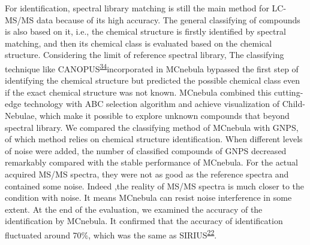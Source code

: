 \documentclass[
]{article}
\begin{document}
For identification, spectral library matching is still the main method
for LC-MS/MS data because of its high accuracy. The general classifying
of compounds is also based on it, i.e., the chemical structure is
firstly identified by spectral matching, and then its chemical class is
evaluated based on the chemical structure. Considering the limit of
reference spectral library, The classifying technique like
CANOPUS\textsuperscript{\protect\hyperlink{ref-duhrkop_systematic_2021}{34}}incorporated
in MCnebula bypassed the first step of identifying the chemical
structure but predicted the possible chemical class even if the exact
chemical structure was not known. MCnebula combined this cutting-edge
technology with ABC selection algorithm and achieve visualization of
Child-Nebulae, which make it possible to explore unknown compounds that
beyond spectral library. We compared the classifying method of MCnebula
with GNPS, of which method relies on chemical structure identification.
When different levels of noise were added, the number of classified
compounds of GNPS decreased remarkably compared with the stable
performance of MCnebula. For the actual acquired MS/MS spectra, they
were not as good as the reference spectra and contained some noise.
Indeed ,the reality of MS/MS spectra is much closer to the condition
with noise. It means MCnebula can resist noise interference in some
extent. At the end of the evaluation, we examined the accuracy of the
identification by MCnebula. It confirmed that the accuracy of
identification fluctuated around 70\%, which was the same as
SIRIUS\textsuperscript{\protect\hyperlink{ref-duhrkop_sirius_2019}{22}}.
\end{document}
